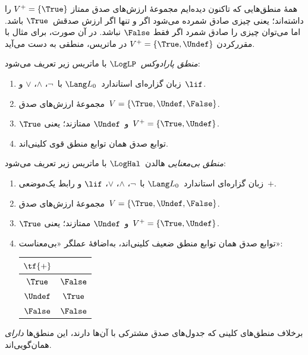 \documentclass[../../../include/open-logic-section]{subfiles}
\begin{document}


همهٔ منطق‌هایی که تاکنون دیده‌ایم مجموعهٔ ارزش‌های صدق ممتاز
$V^+ = \{\True\}$ را داشته‌اند؛ یعنی چیزی صادق شمرده می‌شود اگر و تنها
اگر ارزش صدقش~$\True$ باشد. اما می‌توان چیزی را صادق شمرد اگر فقط
$\False$ نباشد. در آن صورت، برای مثال با مقررکردن
$V^+ = \{\True, \Undef\}$ در ماتریس، منطقی به دست می‌آید.

\begin{defn}
\emph{منطق پارادوکس}~$\LogLP$ با ماتریس زیر تعریف می‌شود:
\begin{enumerate}
  \item زبان گزاره‌ای استاندارد~$\Lang L_0$ با~$\lnot$، $\land$،
  $\lor$ و~$\lif$.
  \item مجموعهٔ ارزش‌های صدق~$V = \{\True, \Undef, \False\}$.
  \item $\True$ و~$\Undef$ ممتازند؛ یعنی~$V^+ = \{\True, \Undef\}$.
  \item توابع صدق همان توابع منطق قوی کلینی‌اند.
\end{enumerate}
\end{defn}

\begin{defn}
\emph{منطق بی‌معنایی} هالدن~$\LogHal$ با ماتریس زیر تعریف می‌شود:
\begin{enumerate}
  \item زبان گزاره‌ای استاندارد~$\Lang L_0$ با~$\lnot$، $\land$،
  $\lor$، $\lif$ و رابط یک‌موضعی~$+$.
  \item مجموعهٔ ارزش‌های صدق~$V = \{\True, \Undef, \False\}$.
  \item $\True$ و~$\Undef$ ممتازند؛ یعنی~$V^+ = \{\True, \Undef\}$.
  \item توابع صدق همان توابع منطق ضعیف کلینی‌اند، به‌اضافهٔ عملگر
  «بی‌معناست»:
  \begin{center}
    \begin{tabular}{c|c} 
    $\tf{+}$ & \\ 
    \hline  
    $\True$ & $\False$ \\ 
    $\Undef$ & $\True$ \\
    $\False$ & $\False$ 
    \end{tabular}
  \end{center}
\end{enumerate}
\end{defn}

برخلاف منطق‌های کلینی که جدول‌های صدق مشترکی با آن‌ها دارند، این منطق‌ها
\emph{دارای} همان‌گویی‌اند.
\end{document}
